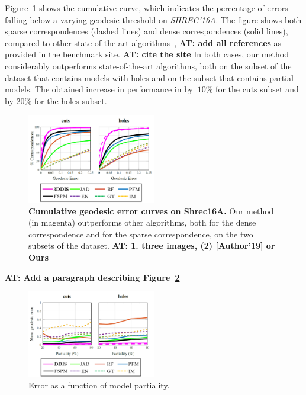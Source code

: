 \documentclass[10pt,twocolumn,letterpaper]{article}
\newcommand{\colornote}[3]{{\color{#1}\bf{#2: #3}\normalfont}}
\newcommand{\colornote}[3]{}
\newcommand {\ayellet}[1]{\colornote{blue}{AT}{#1}}
\begin{document}
Figure~\ref{fig:Shrec16Cumulative} shows the cumulative curve, which indicates the percentage of errors falling below a varying geodesic threshold on {\em SHREC'16A}. 
The figure shows both sparse correspondences (dashed lines) and dense correspondences (solid lines), compared to other state-of-the-art algorithms~\cite{litany2017fully,rodola2017partial},
\ayellet{add all references}
as provided in the benchmark site. \ayellet{cite the site}
In both cases, our method considerably outperforms state-of-the-art algorithms, both on the subset of the dataset that contains models with holes and on the subset that contains partial models.
The obtained increase in performance in by $~10\%$ for the cuts subset and by $20\%$ for the holes subset.

\begin{figure}[htb]
	\label{fig:Shrec16Cumulative}
	\centering
	\includegraphics[width=0.5\textwidth]{figures/ROCSHRECCumulative16.png}
	\caption{{\bf Cumulative geodesic error curves on Shrec16A.} 
	Our method (in magenta) outperforms other algorithms, both for the dense correspondence and for the sparse correspondence, on the two subsets of the dataset.
	\ayellet{1. three images, (2) [Author'19] or Ours}}
\end{figure}

\ayellet{Add a paragraph describing Figure~\ref{fig:Shrec16Part}}

\begin{figure}[htb]
	\label{fig:Shrec16Part}
	\centering
	\includegraphics[width=0.5\textwidth]{figures/ROCSHREC16Part.png}
	\caption{Error as a function of model partiality.}
\end{figure}
\end{document}
